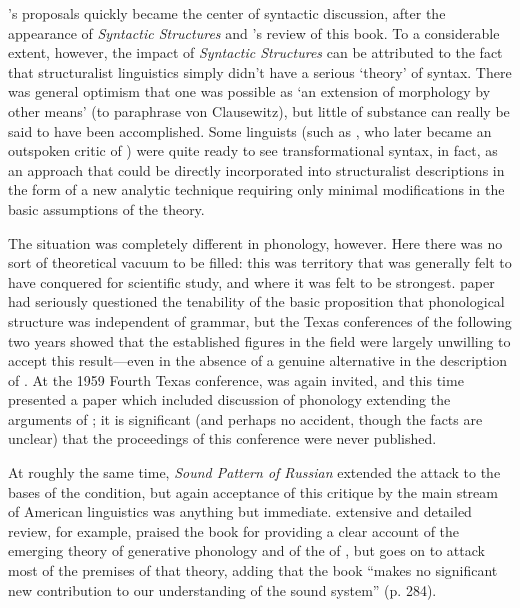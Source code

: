 {\Chomsky}'s proposals quickly became the center of syntactic discussion,
after the appearance of \textsl{Syntactic Structures} and {\Lees}'s
review of this book. To a considerable extent, however, the impact of
\textsl{Syntactic Structures} can be attributed to the fact that
structuralist linguistics simply didn't have a serious `theory' of
syntax. There was general optimism that one was possible as `an
extension of morphology by other means' (to paraphrase von
Clausewitz), but 
little of substance can really be said to have been
accomplished. Some linguists (such as {\Hockett}, who later became an
outspoken critic of ) were quite ready to see
transformational syntax, in fact, as an approach that could be
directly incorporated into structuralist descriptions in the form of a
new analytic technique requiring only minimal modifications in the
basic assumptions of the theory.

The situation was completely different in phonology, however. Here
there was no sort of theoretical vacuum to be filled: this was
territory that  was generally felt to have conquered for
scientific study, and where it was felt to be
strongest.  paper had seriously
questioned the tenability of the basic proposition that phonological
structure was independent of grammar, but the Texas conferences of the
following two years showed that the established figures in the field
were largely unwilling to accept this result—even in the absence of a
genuine alternative in the description of  . At the 1959
Fourth Texas conference, {\Chomsky} was again invited, and this time
presented a paper \citep{chomsky59:4texas} which included discussion
of  phonology extending the arguments of
\citealt{chomsky:halle:lukoff}; it is significant (and perhaps no
accident, though the facts are unclear) that the proceedings of this
conference were never published.

At roughly the same time,  \textsl{Sound Pattern
  of Russian} extended the attack to the bases of the 
condition, but again acceptance of this critique by the main stream of
American linguistics was anything but
immediate.  extensive and detailed
review, for example, praised the book for providing a clear account of
the emerging theory of generative phonology and of the  of
, but goes on to attack most of the premises of that theory,
adding that the book ``makes no significant new contribution to our
understanding of the  sound system'' (p. 284).

